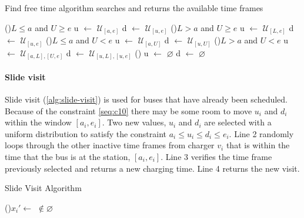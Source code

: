 \documentclass[11pt,a4paper,final]{article}
\newcommand{\I}{\mathbb{I}}                 %
\newcommand{\C}{\mathbb{C}}                 %
\newcommand{\U}{\mathcal{U}}                %
\newcommand{\Sol}{\mathbb{S}}               %
\begin{document}
\begin{algorithm}[h]
\caption{Find free time algorithm searches and returns the available time frames} \label{alg:find-free-time}
    \LinesNumbered

    \Begin
    {
        \If(\tcc*[f]{If $L < a < e < U]$ (\autoref{subfig:sandwich})}){$L \leq a$ and $U \geq e$}
        {
                u $\leftarrow$ $\U_{[a,e]}$\;
                d $\leftarrow$ $\U_{[u,e]}$\;
        }
        \ElseIf(){$L > a$ and $U \geq e$}
        {
                u $\leftarrow$ $\U_{[L,e]}$\;
                d $\leftarrow$ $\U_{[u,e]}$\;
        }
        \ElseIf(){$L \leq a$ and $U < e$}
        {
                u $\leftarrow$ $\U_{[a,U]}$\;
                d $\leftarrow$ $\U_{[u,U]}$\;
        }
        \ElseIf(){$L > a$ and $U < e$}
        {
                u $\leftarrow$ $\U_{[a,L], [U,e]}$\;
                d $\leftarrow$ $\U_{[u,L], [u,e]}$\;
        }
        \Else()
        {
                u $\leftarrow$ $\varnothing$\;
                d $\leftarrow$ $\varnothing$\;
        }

    }
\end{algorithm}

\paragraph{Slide visit}
\label{slide-visit}
Slide visit (\ref{alg:slide-visit}) is used for buses that have already been scheduled. Because of the constraint
\ref{seq:c10} there may be some room to move \(u_i\) and \(d_i\) within the window \([a_i, e_i]\). Two new values, \(u_i\) and
\(d_i\) are selected with a uniform distribution to satisfy the constraint \(a_i \leq u_i \leq d_i \leq e_i\). Line 2 randomly loops
through the other inactive time frames from charger \(v_i\) that is within the time that the bus is at the station, \([a_i,
e_i]\). Line 3 verifies the time frame previously selected and returns a new charging time. Line 4 returns the new visit.

\begin{algorithm}[H]
\caption{Slide Visit Algorithm} \label{alg:slide-visit}
    \LinesNumbered
    \KwIn{$\Sol$}
    \KwOut{$\I_i'$}

    \Begin
    {
        \While {$C_q^j \in \{[a_i, e_i]\} \subset \U_{\C_{v_i}}$}
        {
            \If(){$x_i' \leftarrow$  $\not\in \varnothing$}
            {
                \Return{$\I_i \leftarrow x_i'$} 
            }
        }
    }
\end{algorithm}
\end{document}
